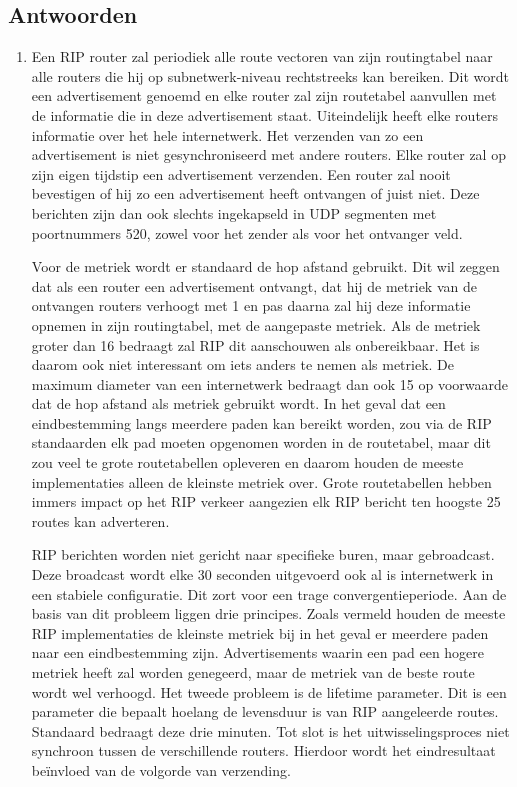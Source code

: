 \documentclass{report}
\begin{document}
\subsection{Antwoorden}
\begin{enumerate}
	\item Een RIP router zal periodiek alle route vectoren van zijn routingtabel naar alle routers die hij op subnetwerk-niveau rechtstreeks kan bereiken. Dit wordt een advertisement genoemd en elke router zal zijn routetabel aanvullen met de informatie die in deze advertisement staat. Uiteindelijk heeft elke routers informatie over het hele internetwerk. Het verzenden van zo een advertisement is niet gesynchroniseerd met andere routers. Elke router zal op zijn eigen tijdstip een advertisement verzenden. Een router zal nooit bevestigen of hij zo een advertisement heeft ontvangen of juist niet. Deze berichten zijn dan ook slechts ingekapseld in UDP segmenten met poortnummers 520, zowel voor het zender als voor het ontvanger veld.
	
Voor de metriek wordt er standaard de hop afstand gebruikt. Dit wil zeggen dat als een router een advertisement ontvangt, dat hij de metriek van de ontvangen routers verhoogt met 1 en pas daarna zal hij deze informatie opnemen in zijn routingtabel, met de aangepaste metriek. Als de metriek groter dan 16 bedraagt zal RIP dit aanschouwen als onbereikbaar. Het is daarom ook niet interessant om iets anders te nemen als metriek. De maximum diameter van een internetwerk bedraagt dan ook 15 op voorwaarde dat de hop afstand als metriek gebruikt wordt. In het geval dat een eindbestemming langs meerdere paden kan bereikt worden, zou via de RIP standaarden elk pad moeten opgenomen worden in de routetabel, maar dit zou veel te grote routetabellen opleveren en daarom houden de meeste implementaties alleen de kleinste metriek over. Grote routetabellen hebben immers impact op het RIP verkeer aangezien elk RIP bericht ten hoogste 25 routes kan adverteren.

RIP berichten worden niet gericht naar specifieke buren, maar gebroadcast. Deze broadcast wordt elke 30 seconden uitgevoerd ook al is internetwerk in een stabiele configuratie. Dit zort voor een trage convergentieperiode. Aan de basis van dit probleem liggen drie principes. Zoals vermeld houden de meeste RIP implementaties de kleinste metriek bij in het geval er meerdere paden naar een eindbestemming zijn. Advertisements waarin een pad een hogere metriek heeft zal worden genegeerd, maar de metriek van de beste route wordt wel verhoogd. Het tweede probleem is de lifetime parameter. Dit is een parameter die bepaalt hoelang de levensduur is van RIP aangeleerde routes. Standaard bedraagt deze drie minuten. Tot slot is het uitwisselingsproces niet synchroon tussen de verschillende routers. Hierdoor wordt het eindresultaat beïnvloed van de volgorde van verzending.


\end{enumerate}
\end{document}
